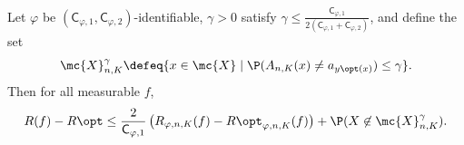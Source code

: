 \documentclass[11pt]{article}
\newcommand{\constant}{\mathsf{C}}  %
\newcommand{\sloss}{\varphi}  %
\begin{document}
\begin{lemma}
  \label{lemma:knn-risk-gap}
  Let $\sloss$ be $(\constant_{\sloss,1},
  \constant_{\sloss,2})$-identifiable, $\gamma > 0$ satisfy $\gamma \le
  \frac{\constant_{\sloss,1}}{2(\constant_{\sloss,1} +
    \constant_{\sloss,2})}$, and define the set
  \begin{equation*}
    \mc{X}_{n,K}^\gamma \defeq
    \{x \in \mc{X} \mid \P(A_{n,K}(x) \neq a_{y\opt(x)}) \le \gamma\}.
  \end{equation*}
  Then for all measurable $f$,
  \begin{equation*}
    R(f) - R\opt \le \frac{2}{\constant_{\sloss,1}}
    \left(R_{\sloss,n,K}(f) - R\opt_{\sloss,n,K}(f)\right)
    + \P(X \not \in \mc{X}_{n,K}^\gamma).
  \end{equation*}
\end{lemma}
\end{document}
